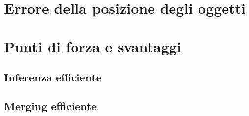 \section{Errore della posizione degli oggetti}
\section{Punti di forza e svantaggi}
\subsection{Inferenza efficiente}
\subsection{Merging efficiente}